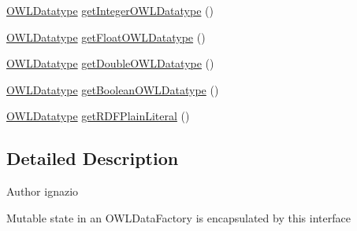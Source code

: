 \begin{DoxyCompactItemize}
\item 
\hyperlink{interfaceorg_1_1semanticweb_1_1owlapi_1_1model_1_1_o_w_l_datatype}{O\-W\-L\-Datatype} \hyperlink{interfaceuk_1_1ac_1_1manchester_1_1cs_1_1owl_1_1owlapi_1_1_o_w_l_data_factory_internals_aec67b8f7bf49e1825e0891254c98d32a}{get\-Integer\-O\-W\-L\-Datatype} ()
\item 
\hyperlink{interfaceorg_1_1semanticweb_1_1owlapi_1_1model_1_1_o_w_l_datatype}{O\-W\-L\-Datatype} \hyperlink{interfaceuk_1_1ac_1_1manchester_1_1cs_1_1owl_1_1owlapi_1_1_o_w_l_data_factory_internals_a0509d4b2078e1d9e31bad686e68fa81d}{get\-Float\-O\-W\-L\-Datatype} ()
\item 
\hyperlink{interfaceorg_1_1semanticweb_1_1owlapi_1_1model_1_1_o_w_l_datatype}{O\-W\-L\-Datatype} \hyperlink{interfaceuk_1_1ac_1_1manchester_1_1cs_1_1owl_1_1owlapi_1_1_o_w_l_data_factory_internals_a975b82c4d3ec139239443b9083f91607}{get\-Double\-O\-W\-L\-Datatype} ()
\item 
\hyperlink{interfaceorg_1_1semanticweb_1_1owlapi_1_1model_1_1_o_w_l_datatype}{O\-W\-L\-Datatype} \hyperlink{interfaceuk_1_1ac_1_1manchester_1_1cs_1_1owl_1_1owlapi_1_1_o_w_l_data_factory_internals_a428fbde8ac0f743d8d8aac20d58225bd}{get\-Boolean\-O\-W\-L\-Datatype} ()
\item 
\hyperlink{interfaceorg_1_1semanticweb_1_1owlapi_1_1model_1_1_o_w_l_datatype}{O\-W\-L\-Datatype} \hyperlink{interfaceuk_1_1ac_1_1manchester_1_1cs_1_1owl_1_1owlapi_1_1_o_w_l_data_factory_internals_a0cb89efab4ef575737dc49a0d05dc545}{get\-R\-D\-F\-Plain\-Literal} ()
\end{DoxyCompactItemize}


\subsection{Detailed Description}
\begin{DoxyAuthor}{Author}
ignazio \begin{DoxyVerb}    Mutable state in an OWLDataFactory is encapsulated by this interface\end{DoxyVerb}
 
\end{DoxyAuthor}


